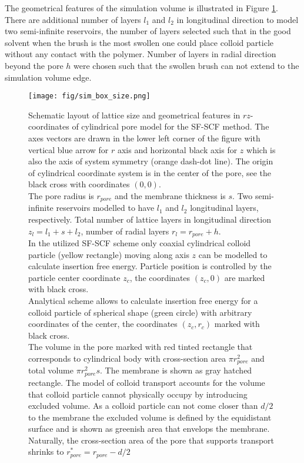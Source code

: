 \documentclass[12pt, a4paper]{article}
\begin{document}
The geometrical features of the simulation volume is illustrated in Figure \ref{fig:sim_box_layout}. 
There are additional number of layers $l_1$ and $l_2$ in longitudinal direction to model two semi-infinite reservoirs, the number of layers selected such that in the good solvent when the brush is the most swollen one could place colloid particle without any contact with the polymer.
Number of layers in radial direction beyond the pore $h$ were chosen such that the swollen brush can not extend to the simulation volume edge.

\begin{figure}
    \centering
    \texttt{[image: fig/sim\_box\_size.png]}
    \caption{
        Schematic layout of lattice size and geometrical features in $rz$-coordinates of cylindrical pore model for the SF-SCF method.
        The axes vectors are drawn in the lower left corner of the figure with vertical blue arrow for $r$ axis and horizontal black axis for $z$ which is also the axis of system symmetry (orange dash-dot line).
        The origin of cylindrical coordinate system is in the center of the pore, see the black cross with coordinates $(0,0)$.
        \\
        The pore radius is $r_{pore}$ and the membrane thickness is $s$. 
        Two semi-infinite reservoirs modelled to have $l_1$ and $l_2$ longitudinal layers, respectively.  
        Total number of lattice layers in longitudinal direction $z_l = l_1 + s + l_2$,
        number of radial layers $r_l = r_{pore} + h$.
        \\    
        In the utilized SF-SCF scheme only coaxial cylindrical colloid particle (yellow rectangle) moving along axis $z$ can be modelled to calculate insertion free energy. Particle position is controlled by the particle center coordinate $z_c$, the coordinates $(z_c, 0)$ are marked with black cross.
        \\
        Analytical scheme allows to calculate insertion free energy for a colloid particle of spherical shape (green circle) with arbitrary coordinates of the center, the coordinates $(z_c, r_c)$ marked with black cross.
        \\
        The volume in the pore marked with red tinted rectangle that corresponds to cylindrical body with cross-section area $\pi r_{pore}^2$ and total volume $\pi r_{pore}^2 s$.
        The membrane is shown as gray hatched rectangle.
        The model of colloid transport accounts for the volume that colloid particle cannot physically occupy by introducing excluded volume.  
        As a colloid particle can not come closer than $d/2$ to the membrane the excluded volume is defined by the equidistant surface and is shown as greenish area that envelops the membrane.
        Naturally, the cross-section area of the pore that supports transport shrinks to $r_{pore}^{\ast} = r_{pore} - d/2$ 
    }
    \label{fig:sim_box_layout}
\end{figure}
\end{document}
